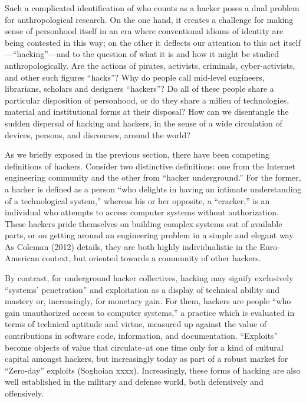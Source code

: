 \documentclass[10pt,letter,oneside]{scrartcl}
\begin{document}
Such a complicated identification of who counts as a hacker poses a dual problem for
anthropological research.  On the one hand, it creates a challenge for making
sense of personhood itself in an era where conventional idioms of identity are
being contested in this way; on the other it deflects our attention to this act
itself---``hacking''---and to the question of what it is and how it might be
studied anthropologically.  Are the actions of pirates, activists, criminals,
cyber-activists, and other such figures ``hacks''?  Why do people call
mid-level engineers, librarians, scholars and designers ``hackers''?  Do all of 
these people share a particular disposition of personhood, or do they share a 
milieu of technologies, material and institutional forms at their disposal?  
How can we disentangle the sudden dispersal of hacking and hackers, in the sense
of a wide circulation of devices, persons, and discourses, around the world?

As we briefly exposed in the previous section, there have been competing 
definitions of hackers.  Consider two distinctive definitions: one from the 
Internet engineering community and the other from ``hacker underground.''  For 
the former, a hacker is defined as a person ``who delights in having an intimate understanding of a technological system,'' whereas his or her opposite, a 
``cracker,'' is an individual who attempts to access computer systems without authorization.  These hackers pride themselves on building complex systems out 
of available parts, or on getting around an engineering problem in a simple and 
elegant way.  As Coleman (2012) details, they are both highly individualistic 
in the Euro-American context, but oriented towards a community of other hackers.

By contrast, for underground hacker collectives, hacking may signify exclusively
``systems' penetration'' and exploitation as a display of technical ability 
and mastery or, increasingly, for monetary gain.  For them, hackers are people 
``who gain unauthorized access to computer systems,'' a practice which is evaluated 
in terms of technical aptitude and virtue, measured up against the value of 
contributions in software code, information, and documentation.  ``Exploits'' become objects of value that circulate--at one time only for a kind of cultural capital 
amongst hackers, but increasingly today as part of a robust market for ``Zero-day'' exploits (Soghoian xxxx).  Increasingly, these forms of hacking are also well
established in the military and defense world, both defensively and offensively.
\end{document}

